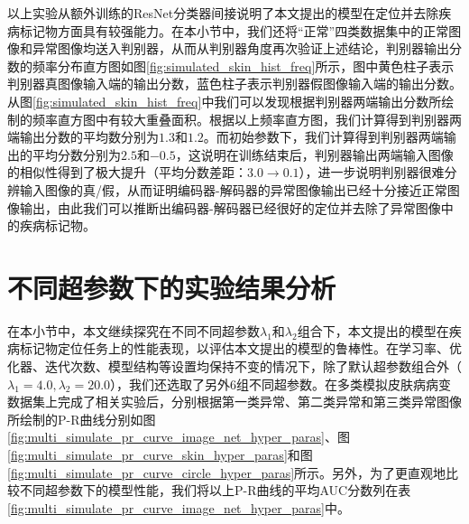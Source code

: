 以上实验从额外训练的ResNet分类器间接说明了本文提出的模型在定位并去除疾病标记物方面具有较强能力。在本小节中，我们还将“正常”四类数据集中的正常图像和异常图像均送入判别器，从而从判别器角度再次验证上述结论，判别器输出分数的频率分布直方图如图\ref{fig:simulated_skin_hist_freq}所示，图中黄色柱子表示判别器真图像输入端的输出分数，蓝色柱子表示判别器假图像输入端的输出分数。从图\ref{fig:simulated_skin_hist_freq}中我们可以发现根据判别器两端输出分数所绘制的频率直方图中有较大重叠面积。根据以上频率直方图，我们计算得到判别器两端输出分数的平均数分别为$1.3 $和$1.2$。而初始参数下，我们计算得到判别器两端输出的平均分数分别为$2.5$和$-0.5$，这说明在训练结束后，判别器输出两端输入图像的相似性得到了极大提升（平均分数差距：$3.0\rightarrow 0.1$），进一步说明判别器很难分辨输入图像的真/假，从而证明编码器-解码器的异常图像输出已经十分接近正常图像输出，由此我们可以推断出编码器-解码器已经很好的定位并去除了异常图像中的疾病标记物。
\section{不同超参数下的实验结果分析}\label{sec:multi_classes_hyper_paras}
在本小节中，本文继续探究在不同不同超参数$\lambda_{1}$和$\lambda_{2}$组合下，本文提出的模型在疾病标记物定位任务上的性能表现，以评估本文提出的模型的鲁棒性。在学习率、优化器、迭代次数、模型结构等设置均保持不变的情况下，除了默认超参数组合外（$\lambda_{1}=4.0,\lambda_{2}=20.0$），我们还选取了另外$6$组不同超参数。在多类模拟皮肤病病变数据集上完成了相关实验后，分别根据第一类异常、第二类异常和第三类异常图像所绘制的P-R曲线分别如图\ref{fig:multi_simulate_pr_curve_image_net_hyper_paras}、图\ref{fig:multi_simulate_pr_curve_skin_hyper_paras}和图\ref{fig:multi_simulate_pr_curve_circle_hyper_paras}所示。另外，为了更直观地比较不同超参数下的模型性能，我们将以上P-R曲线的平均AUC分数列在表\ref{fig:multi_simulate_pr_curve_image_net_hyper_paras}中。

